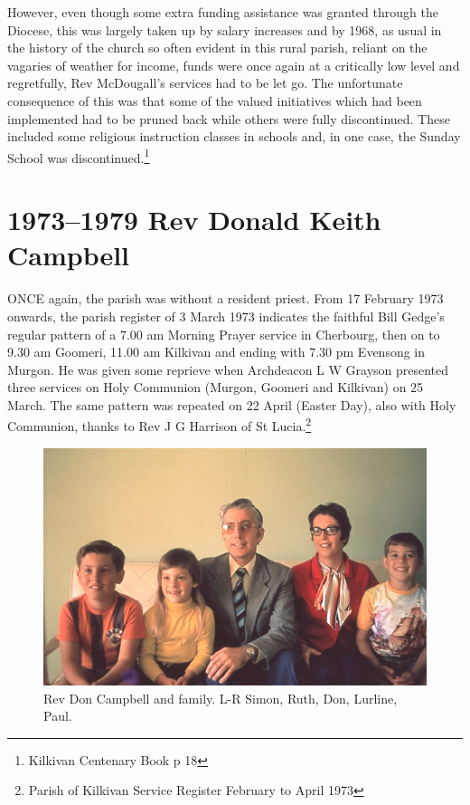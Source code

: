 However, even though some extra funding assistance was granted through the Diocese, this was largely taken up by salary increases and by 1968, as usual in the history of the church so often evident in this rural parish, reliant on the vagaries of weather for income, funds were once again at a critically low level and regretfully, Rev McDougall's services had to be let go. The unfortunate consequence of this was that some of the valued initiatives which had been implemented had to be pruned back while others were fully discontinued. These included some religious instruction classes in schools and, in one case, the Sunday School was discontinued.\footnote{Kilkivan Centenary Book p 18}
\balance


\printendnotes[custom]
\setcounter{endnote}{0}
\chapter{1973--1979 Rev Donald Keith Campbell}
\nobalance


\lettrine[lines=3]{O}{NCE}
 again, the parish was without a resident priest. From 17 February 1973 onwards, the parish register of 3 March 1973 indicates the faithful Bill Gedge's regular pattern of a 7.00 am Morning Prayer service in Cherbourg, then on to 9.30 am Goomeri, 11.00 am Kilkivan and ending with 7.30 pm Evensong in Murgon. He was given some reprieve when Archdeacon L W Grayson presented three services on Holy Communion (Murgon, Goomeri and Kilkivan) on 25 March. The same pattern was repeated on 22 April (Easter Day), also with Holy Communion, thanks to Rev J G Harrison of St Lucia.\footnote{Parish of Kilkivan Service Register February to April 1973}







\begin{figure}
\begin{center}
\includegraphics[width=1.\linewidth,center]{../images/DonCampbellAndFamily.png}
\caption{Rev Don Campbell and family. L-R Simon, Ruth, Don, Lurline, Paul.}
\end{center}
\end{figure}




